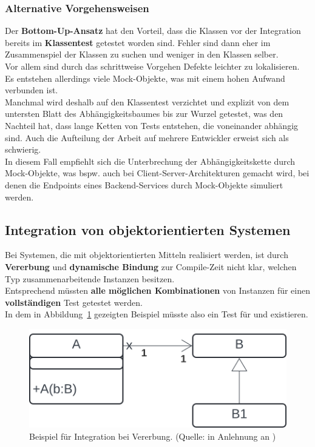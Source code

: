 \subsubsection*{Alternative Vorgehensweisen}
Der \textbf{Bottom-Up-Ansatz} hat den Vorteil, dass die Klassen vor der Integration bereits im \textbf{Klassentest} getestet worden sind.
Fehler sind dann eher im Zusammenspiel der Klassen zu suchen und weniger in den Klassen selber.\\
Vor allem sind durch das schrittweise Vorgehen Defekte leichter zu lokalisieren.\\
Es entstehen allerdings viele Mock-Objekte, was mit einem hohen Aufwand verbunden ist.\\
Manchmal wird deshalb auf den Klassentest verzichtet und explizit von dem untersten Blatt des Abhängigkeitsbaumes bis zur Wurzel getestet, was den Nachteil hat, dass lange Ketten von Tests entstehen, die voneinander abhängig sind.
Auch die Aufteilung der Arbeit auf mehrere Entwickler erweist sich als schwierig.\\
In diesem Fall empfiehlt sich die Unterbrechung der Abhängigkeitskette durch Mock-Objekte, was bspw. auch bei Client-Server-Architekturen gemacht wird, bei denen die Endpoints eines Backend-Services durch Mock-Objekte simuliert werden.

\subsection{Integration von objektorientierten Systemen}
Bei Systemen, die mit objektorientierten Mitteln realisiert werden, ist durch \textbf{Vererbung} und \textbf{dynamische Bindung} zur Compile-Zeit nicht klar, welchen Typ zusammenarbeitende Instanzen besitzen.\\
Entsprechend müssten \textbf{alle möglichen Kombinationen} von Instanzen für einen \textbf{vollständigen} Test getestet werden.\\
In dem in Abbildung~\ref{fig:integration-vererbung} gezeigten Beispiel müsste also ein Test für  und  existieren.

\begin{figure}
    \centering
    \includegraphics[scale=0.4]{part four/Testende Verfahren/img/integration-vererbung}
    \caption{Beispiel für Integration bei Vererbung. (Quelle: in Anlehnung an \cite[Abb. 5.6, 61]{Wed09c})}
    \label{fig:integration-vererbung}
\end{figure}

